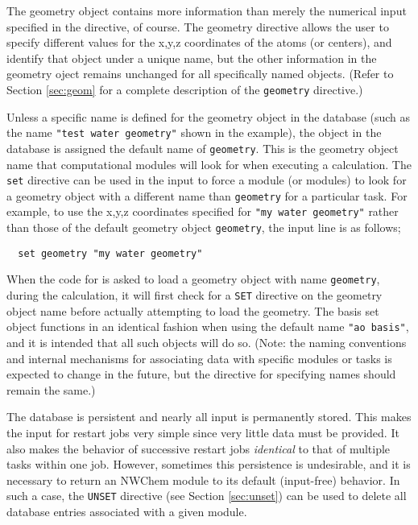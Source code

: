 The geometry object contains more information than merely
the numerical input specified in the directive, of course.  The geometry directive
allows the user to specify different values for the x,y,z coordinates of
the atoms (or centers), and identify that object under a unique name, but 
the other information in the geometry oject remains unchanged for all
specifically named objects.  (Refer to Section \ref{sec:geom}
for a complete description of the {\tt geometry}
directive.)  

Unless a specific name is defined for the geometry object in the database
(such as the name  \verb+"test water geometry"+ shown in the example), 
the object in the database is 
assigned the default name of \verb+geometry+.  This is the geometry object name
that computational modules
will look for when executing a calculation.  
The {\tt set} directive can be used in the input to force a
module (or modules) to look for a geometry object with 
a different name than \verb+geometry+ for a particular task.  For example, 
to use the x,y,z coordinates specified for \verb+"my water geometry"+ 
rather than those of the default geometry object \verb+geometry+, the
input line is as follows;

\begin{verbatim}
  set geometry "my water geometry"
\end{verbatim}

When the code for is asked to load a geometry object
with name \verb+geometry+, during the calculation, it will first check for 
a \verb+SET+ directive on the geometry object name before actually attempting 
to load the geometry.  The basis set object
functions in an identical fashion
when using the default name \verb+"ao basis"+, and it is intended that all such
objects will do so.  (Note: the naming conventions and internal mechanisms for
associating data with specific modules or tasks is expected to change in
the future, but the directive for specifying names should remain the same.)

\fussy

The database is persistent and nearly all input is permanently stored.
This makes the input for restart jobs very simple since very little
data must be provided.  It also makes the behavior of successive
restart jobs {\em identical} to that of multiple tasks within one job.
However, sometimes this persistence is undesirable, and it is necessary to
return an NWChem module to its default (input-free) behavior. In such a case, the
\verb+UNSET+ directive (see Section \ref{sec:unset}) 
can be used to delete all
database entries associated with a given module.


